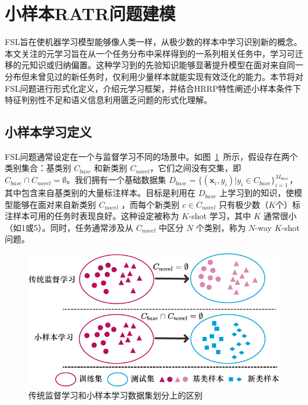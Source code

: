 \section{小样本RATR问题建模}
\label{sec:fsl_modeling}

FSL旨在使机器学习模型能够像人类一样，从极少数的样本中学习识别新的概念。本文关注的元学习旨在从一个任务分布中采样得到的一系列相关任务中，学习可迁移的元知识或归纳偏置。这种学习到的先验知识能够显著提升模型在面对来自同一分布但未曾见过的新任务时，仅利用少量样本就能实现有效泛化的能力。本节将对FSL问题进行形式化定义，介绍元学习框架，并结合HRRP特性阐述小样本条件下特征判别性不足和语义信息利用匮乏问题的形式化理解。

\subsection{小样本学习定义}
\label{subsec:fsl_definition}

FSL问题通常设定在一个与监督学习不同的场景中。如图~\ref{fig:dataset_fsl}~所示，假设存在两个类别集合：基类别 $C_{base}$ 和新类别 $C_{novel}$，它们之间没有交集，即 $C_{base} \cap C_{novel} = \emptyset$。我们拥有一个基础数据集 $D_{base} = \{(\mathbf{x}_i, y_i) | y_i \in C_{base}\}_{i=1}^{M_{base}}$，其中包含来自基类别的大量标注样本。目标是利用在 $D_{base}$ 上学习到的知识，使模型能够在面对来自新类别 $C_{novel}$ ，而每个新类别 $c \in C_{novel}$ 只有极少数（$K$个）标注样本可用的任务时表现良好。这种设定被称为 $K$-shot 学习，其中 $K$ 通常很小（如1或5）。同时，任务通常涉及从 $C_{novel}$ 中区分 $N$ 个类别，称为 $N$-way $K$-shot 问题。

\begin{figure}[h]
    \centering
    \includegraphics[width=0.7\linewidth]{figures/fsl_dataset.pdf}
    \caption{传统监督学习和小样本学习数据集划分上的区别}
    \label{fig:dataset_fsl}
\end{figure}

